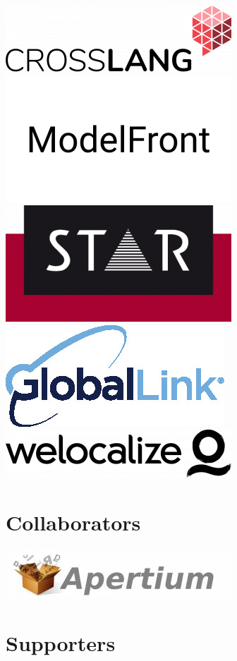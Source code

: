 \documentclass[a4paper,11pt,twoside]{book}
\begin{document}
\includegraphics[width=0.40\columnwidth]{logos/crosslang-logo.png} \hfill
\vfill
\hfill \includegraphics[width=0.40\columnwidth]{logos/modelfront-logo.png} 
\vfill
\includegraphics[width=0.40\columnwidth]{logos/star-logo.png} \hfill
\vfill
\hfill \includegraphics[width=0.40\columnwidth]{logos/global-link.jpg} 
\vfill
\includegraphics[width=0.40\columnwidth]{logos/welocalize-logo.png}  \hfill
\vfill
\thispagestyle{empty}

\newpage

\section*{Collaborators}
\begin{center}
\includegraphics[width=0.5\columnwidth]{logos/apertium-logo.jpg}
\end{center}

\vfill

\section*{Supporters}
\end{document}
